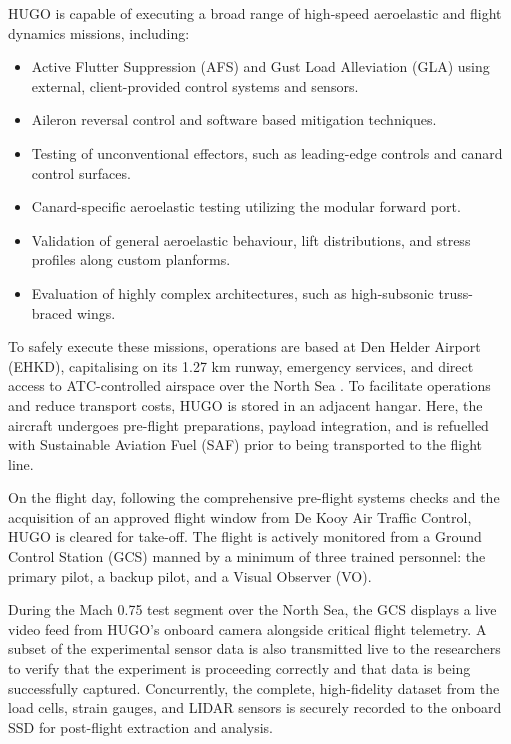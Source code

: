 HUGO is capable of executing a broad range of high-speed aeroelastic and flight dynamics missions, including:
\begin{itemize}
    \item Active Flutter Suppression (AFS) and Gust Load Alleviation (GLA) using external, client-provided control systems and sensors.
    \item Aileron reversal control and software based mitigation techniques.
    \item Testing of unconventional effectors, such as leading-edge controls and canard control surfaces.
    \item Canard-specific aeroelastic testing utilizing the modular forward port.
    \item Validation of general aeroelastic behaviour, lift distributions, and stress profiles along custom planforms.
    \item Evaluation of highly complex architectures, such as high-subsonic truss-braced wings.
\end{itemize}

To safely execute these missions, operations are based at Den Helder Airport (EHKD), capitalising on its 1.27 km runway, emergency services, and direct access to ATC-controlled airspace over the North Sea \cite{DenHelderAirport2013DHANieuwsbrief}. To facilitate operations and reduce transport costs, HUGO is stored in an adjacent hangar. Here, the aircraft undergoes pre-flight preparations, payload integration, and is refuelled with Sustainable Aviation Fuel (SAF) prior to being transported to the flight line.

On the flight day, following the comprehensive pre-flight systems checks and the acquisition of an approved flight window from De Kooy Air Traffic Control, HUGO is cleared for take-off. The flight is actively monitored from a Ground Control Station (GCS) manned by a minimum of three trained personnel: the primary pilot, a backup pilot, and a Visual Observer (VO). 

During the Mach 0.75 test segment over the North Sea, the GCS displays a live video feed from HUGO's onboard camera alongside critical flight telemetry. A subset of the experimental sensor data is also transmitted live to the researchers to verify that the experiment is proceeding correctly and that data is being successfully captured. Concurrently, the complete, high-fidelity dataset from the load cells, strain gauges, and LIDAR sensors is securely recorded to the onboard SSD for post-flight extraction and analysis.



